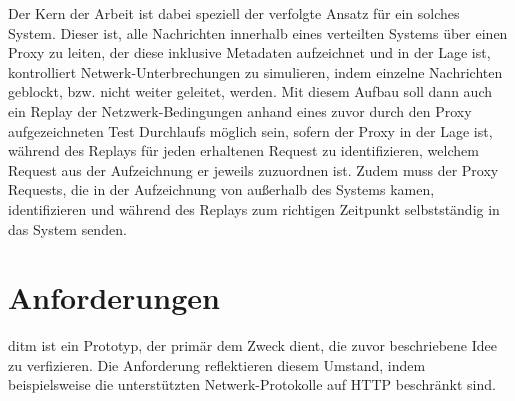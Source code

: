\documentclass[a4paper]{report}
\begin{document}
Der Kern der Arbeit ist dabei speziell der verfolgte Ansatz für ein solches System. Dieser ist, alle Nachrichten innerhalb eines
verteilten Systems über einen Proxy zu leiten, der diese inklusive Metadaten aufzeichnet und in der Lage ist, kontrolliert
Netwerk-Unterbrechungen zu simulieren, indem einzelne Nachrichten geblockt, bzw. nicht weiter geleitet, werden.
Mit diesem Aufbau soll dann auch ein Replay der Netzwerk-Bedingungen anhand eines zuvor durch den Proxy aufgezeichneten
Test Durchlaufs möglich sein, sofern der Proxy in der Lage ist, während des Replays für jeden erhaltenen Request zu identifizieren,
welchem Request aus der Aufzeichnung er jeweils zuzuordnen ist. Zudem muss der Proxy Requests, die in der Aufzeichnung von
außerhalb des Systems kamen, identifizieren und während des Replays zum richtigen Zeitpunkt selbstständig in das System senden.

\section{Anforderungen}
ditm ist ein Prototyp, der primär dem Zweck dient, die zuvor beschriebene Idee zu verfizieren.
Die Anforderung reflektieren diesem Umstand, indem beispielsweise die unterstützten Netwerk-Protokolle auf HTTP beschränkt sind.
\end{document}
